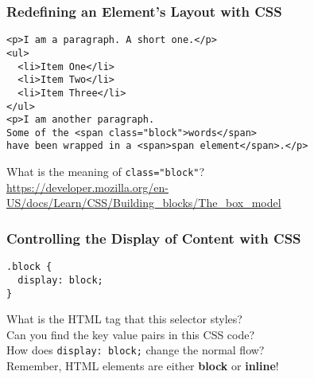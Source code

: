 \documentclass[14pt,aspectratio=169]{beamer}
\begin{document}
%
\begin{frame}[fragile]
  \frametitle{Redefining an Element's Layout with CSS}
  \normalsize
  \hspace*{.15in}
  \begin{minipage}{6in}
    \vspace*{.2in}
    \begin{verbatim}
<p>I am a paragraph. A short one.</p>
<ul>
  <li>Item One</li>
  <li>Item Two</li>
  <li>Item Three</li>
</ul>
<p>I am another paragraph.
Some of the <span class="block">words</span>
have been wrapped in a <span>span element</span>.</p>
    \end{verbatim}
  \end{minipage}
  \vspace*{.05in}
  \begin{center}
    \noindent What is the meaning of {\tt class="block"}? \\
    \noindent  \url{https://developer.mozilla.org/en-US/docs/Learn/CSS/Building_blocks/The_box_model}
  \end{center}
\end{frame}

%
\begin{frame}[fragile]
  \frametitle{Controlling the Display of Content with CSS}
  \normalsize
  \hspace*{.25in}
  \begin{minipage}{6in}
    \vspace*{.2in}
    \begin{verbatim}
.block {
  display: block;
}
    \end{verbatim}
  \end{minipage}
  \vspace*{.05in}
  \begin{center}
    \noindent What is the HTML tag that this selector styles? \\
    \noindent Can you find the key value pairs in this CSS code? \\
    \noindent How does {\tt display: block;} change the normal flow? \\
    \noindent Remember, HTML elements are either {\bf block} or {\bf inline}! \\
  \end{center}
\end{frame}
\end{document}
